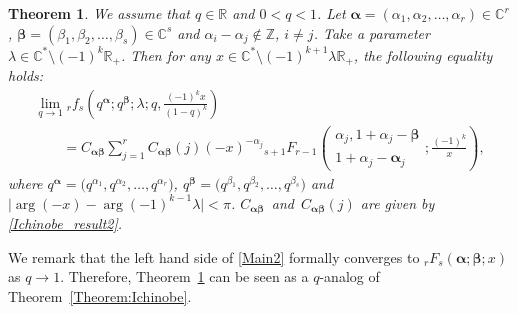 \documentclass[pdftex]{sigma}
\numberwithin{equation}{section}
\newtheorem{Theorem}{Theorem}[section]
\begin{document}
\begin{Theorem}\label{Theorem:Main2}We assume that $q\in\mathbb{R}$ and $0<q<1$. Let $\bm{\alpha}=(\alpha_1,\alpha_2,\ldots,\alpha_r)\in\mathbb{C}^r$, $\bm{\beta}=(\beta_1,\beta_2,\ldots,\beta_s)\in\mathbb{C}^s$ and $\alpha_i-\alpha_j\notin\mathbb{Z}$, $i\neq j$. Take a parameter $\lambda\in\mathbb{C}^*\setminus (-1)^k\mathbb{R}_+$. Then for any $x\in\mathbb{C}^*\setminus(-1)^{k+1}\lambda\mathbb{R}_+$, the following equality holds:
\begin{gather}
\lim_{q\to1}{}_rf_s \left(q^{\bm{\alpha}};q^{\bm{\beta}};\lambda;q,\frac{(-1)^kx}{(1-q)^k}\right)\nonumber\\
\qquad {} =C_{\bm{\alpha\beta}}\sum_{j=1}^rC_{\bm{\alpha\beta}}(j)(-x)^{-\alpha_j}{}_{s+1}F_{r-1}\left(\!
\begin{matrix}
\alpha_j,1+\alpha_j-\bm{\beta}\\
1+\alpha_j-\widehat{\bm{\alpha}_j}
\end{matrix}
;\frac{(-1)^k}{x}
\right),\label{Main2}
\end{gather}
where $q^{\bm{\alpha}}=\big(q^{\alpha_1},q^{\alpha_2},\ldots,q^{\alpha_r}\big)$, $q^{\bm{\beta}}=\big(q^{\beta_1},q^{\beta_2},\ldots,q^{\beta_s}\big)$ and $\big|\arg{(-x)}-\arg{(-1)^{k-1}}\lambda\big|<\pi$. $C_{\bm{\alpha\beta}}$~and~$C_{\bm{\alpha\beta}}(j)$ are given by \eqref{Ichinobe_result2}.
\end{Theorem}
We remark that the left hand side of \eqref{Main2} formally converges to ${}_{r}F_{s}(\bm{\alpha};\bm{\beta};x)$ as $q\to1$. Therefore, Theorem~\ref{Theorem:Main2} can be seen as a $q$-analog of Theorem~\ref{Theorem:Ichinobe}.
\end{document}
